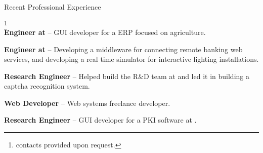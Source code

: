 \begin{rubric}{Recent Professional Experience}{ \footnote{contacts
      provided upon request.}  \\

    \entry*[2013-06 - Present] \textbf{Engineer at
      } -- GUI
    developer for a ERP focused on agriculture.

    \entry*[2012 - 2013-06] \textbf{Engineer at
      } --
    Developing a middleware for connecting remote banking web services,
    and developing a real time simulator for interactive lighting
    installations.

    \entry*[2010 - 2012] \textbf{Research Engineer} -- Helped build
    the R\&D team at 
    and led it in building a captcha recognition system.

    \entry*[2007-2009] \textbf{Web Developer} -- Web systems freelance
    developer.

    \entry*[2005 - 2007] \textbf{Research Engineer} -- GUI developer
    for a PKI software at .

  }
\end{rubric}
